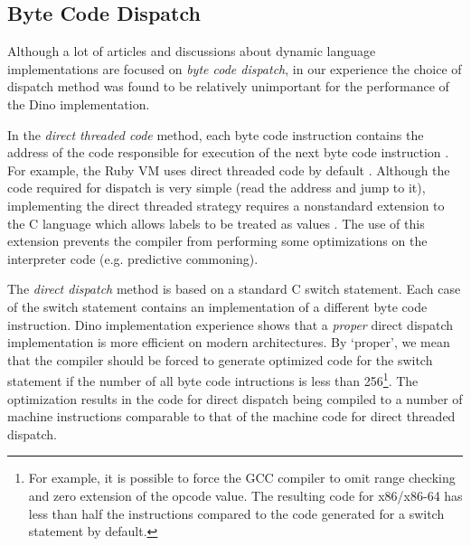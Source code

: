 \documentclass[preprint]{sigplanconf}
\begin{document}
\subsection{Byte Code Dispatch}

  Although a lot of articles and discussions about dynamic language
implementations are focused on \emph{byte code dispatch}, in our experience %
the choice of dispatch
method was found to be relatively unimportant for the performance of the Dino implementation.

  In the \emph{direct threaded code} method, each byte code
instruction contains the address of the code responsible for execution of
the next byte code instruction \cite{Bell} \cite{Ertl}.  For example, the Ruby VM
uses direct threaded code by default \cite{Sasada}.
Although the code required for dispatch is very simple (read the address and jump to it), implementing the direct threaded strategy requires a nonstandard extension to the C language which allows labels to be treated as values \cite{GCC}. The use of this extension prevents the compiler from performing some optimizations on the interpreter code (e.g. predictive commoning).

  The \emph{direct dispatch} method is based on a standard C switch
statement. Each case of the switch statement contains an implementation of a different byte code instruction. Dino implementation
experience shows that a \emph{proper} direct dispatch implementation is
more efficient on modern architectures. By `proper', we mean that the compiler
should be forced to generate optimized code for the switch statement
if the number of all byte code intructions is less than 256\footnote{For example, it is possible to force the GCC compiler to omit range checking and zero extension of the opcode value. The resulting code for x86/x86-64 has less than half the instructions compared to the code generated for a switch statement by default.}. The optimization results in the code for direct dispatch being compiled to a number of machine instructions comparable to that of the machine code for direct threaded dispatch.
\end{document}
